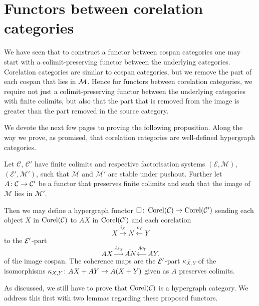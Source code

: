 \section{Functors between corelation categories} \label{sec.corelfunctors}
We have seen that to construct a functor between cospan categories one may start
with a colimit-preserving functor between the underlying categories. Corelation
categories are similar to cospan categories, but we remove the part of each
cospan that lies in $\mathcal M$. Hence for functors between corelation categories,
we require not just a colimit-preserving functor between the underlying
categories with finite colimits, but also that the part that is removed from the
image is greater than the part removed in the source category.

We devote the next few pages to proving the following proposition. Along the way
we prove, as promised, that corelation categories are well-defined hypergraph
categories.

\begin{proposition} \label{prop.corelfunctors}
  Let $\mathcal C$, $\mathcal C'$ have finite colimits and respective
  factorisation systems $(\mathcal E, \mathcal M)$, $(\mathcal E', \mathcal M')$,
  such that $\mathcal M$ and $\mathcal M'$ are stable under pushout. Further let
  $A{\colon} \mathcal C \to \mathcal C'$ be a functor that preserves finite colimits
  and such that the image of $\mathcal M$ lies in $\mathcal M'$.

  Then we may define a hypergraph functor $\square{\colon} \operatorname{{Corel}}(\mathcal C) \to
  \operatorname{{Corel}}(\mathcal C')$ sending each object $X$ in $\operatorname{{Corel}}(\mathcal C)$ to $AX$ in
  $\operatorname{{Corel}}(\mathcal C')$ and each corelation 
  \[
    X \stackrel{i_X}{\longrightarrow} N \stackrel{o_Y}{\longleftarrow} Y 
  \]
  to the $\mathcal E'$-part
  \[
    AX \stackrel{Ai_X}{\longrightarrow} \overline{AN}
    \stackrel{Ao_Y}{\longleftarrow} AY.
  \]
  of the image cospan. The coherence maps are the $\mathcal E'$-part
  $\overline{\kappa_{X,Y}}$ of the isomorphisms $\kappa_{X,Y}{\colon} AX+AY \to
  A(X+Y)$ given as $A$ preserves colimits.
\end{proposition}

As discussed, we still have to prove that $\operatorname{{Corel}}(\mathcal C)$ is a hypergraph
category. We address this first with two lemmas regarding these proposed
functors.

